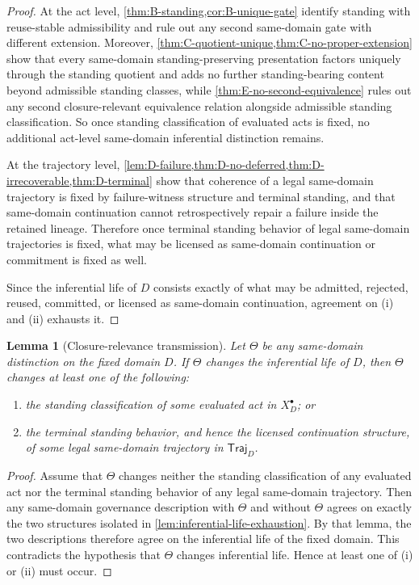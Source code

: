 \documentclass[11pt]{article}
\theoremstyle{plain}
\newtheorem{lemma}[theorem]{Lemma}
\theoremstyle{definition}
\newcommand{\Eval}{X_D^{\bullet}}
\newcommand{\domain}{D}
\newcommand{\Traj}{\mathsf{Traj}_D}
\begin{document}
\begin{proof}
At the act level, \cref{thm:B-standing,cor:B-unique-gate} identify standing with reuse-stable admissibility and rule out any second same-domain gate with different extension. Moreover, \cref{thm:C-quotient-unique,thm:C-no-proper-extension} show that every same-domain standing-preserving presentation factors uniquely through the standing quotient and adds no further standing-bearing content beyond admissible standing classes, while \cref{thm:E-no-second-equivalence} rules out any second closure-relevant equivalence relation alongside admissible standing classification. So once standing classification of evaluated acts is fixed, no additional act-level same-domain inferential distinction remains.

At the trajectory level, \cref{lem:D-failure,thm:D-no-deferred,thm:D-irrecoverable,thm:D-terminal} show that coherence of a legal same-domain trajectory is fixed by failure-witness structure and terminal standing, and that same-domain continuation cannot retrospectively repair a failure inside the retained lineage. Therefore once terminal standing behavior of legal same-domain trajectories is fixed, what may be licensed as same-domain continuation or commitment is fixed as well.

Since the inferential life of $\domain$ consists exactly of what may be admitted, rejected, reused, committed, or licensed as same-domain continuation, agreement on (i) and (ii) exhausts it.
\end{proof}

\begin{lemma}[Closure-relevance transmission]
\label{lem:closure-transmission}
Let $\Theta$ be any same-domain distinction on the fixed domain $\domain$. If $\Theta$ changes the inferential life of $\domain$, then $\Theta$ changes at least one of the following:
\begin{enumerate}[label=(\roman*), leftmargin=2.5em]
    \item the standing classification of some evaluated act in $\Eval$; or
    \item the terminal standing behavior, and hence the licensed continuation structure, of some legal same-domain trajectory in $\Traj$.
\end{enumerate}
\end{lemma}

\begin{proof}
Assume that $\Theta$ changes neither the standing classification of any evaluated act nor the terminal standing behavior of any legal same-domain trajectory. Then any same-domain governance description with $\Theta$ and without $\Theta$ agrees on exactly the two structures isolated in \cref{lem:inferential-life-exhaustion}. By that lemma, the two descriptions therefore agree on the inferential life of the fixed domain. This contradicts the hypothesis that $\Theta$ changes inferential life. Hence at least one of (i) or (ii) must occur.
\end{proof}
\end{document}
